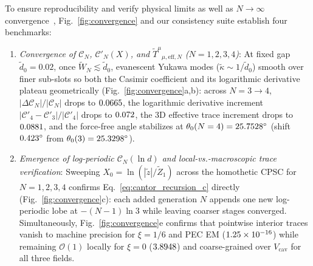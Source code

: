 \documentclass[aps,prd,twocolumn,10pt,showkeys,nofootinbib,floatfix,longbibliography]{revtex4-2}
\begin{document}
To ensure reproducibility and verify physical limits as well as $N \to \infty$ convergence~\cite{shajesh2016,gordon2026prd}, Fig.~\ref{fig:convergence} and our consistency suite establish four benchmarks:
\begin{enumerate}
    \item \emph{Convergence of $\mathcal{C}_N$, $\mathcal{C}'_N(X)$, and $\tilde{T}^\mu{}_{\mu,\mathrm{eff},N}$ ($N = 1, 2, 3, 4$)}: At fixed gap $\tilde{d}_0 = 0.02$, once $\tilde{W}_N \lesssim \tilde{d}_0$, evanescent Yukawa modes ($\tilde{\kappa} \sim 1/\tilde{d}_0$) smooth over finer sub-slots so both the Casimir coefficient and its logarithmic derivative plateau geometrically (Fig.~\ref{fig:convergence}a,b): across $N = 3 \to 4$, $|\Delta\mathcal{C}_N|/|\mathcal{C}_N|$ drops to $0.0665$, the logarithmic derivative increment $|\mathcal{C}'_4 - \mathcal{C}'_3|/|\mathcal{C}'_4|$ drops to $0.072$, the 3D effective trace increment drops to $0.0881$, and the force-free angle stabilizes at $\theta_0(N=4) = 25.7528^\circ$ (shift $0.423^\circ$ from $\theta_0(3) = 25.3298^\circ$).
    \item \emph{Emergence of log-periodic $\mathcal{C}_N(\ln d)$ and local-vs.-macroscopic trace verification}: Sweeping $X_0 = \ln(|\tilde{z}|/\tilde{Z}_1)$ across the homothetic CPSC for $N = 1, 2, 3, 4$ confirms Eq.~\eqref{eq:cantor_recursion_c} directly (Fig.~\ref{fig:convergence}c): each added generation $N$ appends one new log-periodic lobe at $-(N-1)\ln 3$ while leaving coarser stages converged. Simultaneously, Fig.~\ref{fig:convergence}e confirms that pointwise interior traces vanish to machine precision for $\xi = 1/6$ and PEC EM ($1.25\times 10^{-16}$) while remaining $\mathcal{O}(1)$ locally for $\xi = 0$ ($3.8948$) and coarse-grained over $V_{\mathrm{cav}}$ for all three fields.

\end{enumerate}
\end{document}

